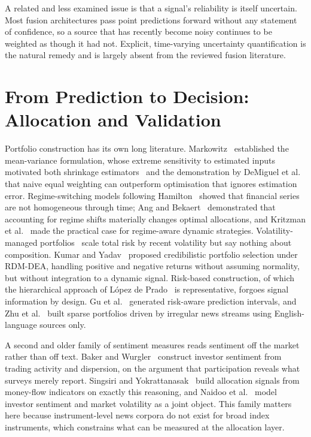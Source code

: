 A related and less examined issue is that a signal's reliability is itself uncertain.
Most fusion architectures pass point predictions forward without any statement of
confidence, so a source that has recently become noisy continues to be weighted as though
it had not. Explicit, time-varying uncertainty quantification is the natural remedy and
is largely absent from the reviewed fusion literature.

\section{From Prediction to Decision: Allocation and Validation}

Portfolio construction has its own long literature. Markowitz~\cite{markowitz1952}
established the mean-variance formulation, whose extreme sensitivity to estimated inputs
motivated both shrinkage estimators~\cite{ledoit2004} and the demonstration by DeMiguel et
al.~\cite{demiguel2009} that naive equal weighting can outperform optimisation that
ignores estimation error. Regime-switching models following Hamilton~\cite{hamilton1989}
showed that financial series are not homogeneous through time; Ang and
Bekaert~\cite{ang2002} demonstrated that accounting for regime shifts materially changes
optimal allocations, and Kritzman et al.~\cite{kritzman2012} made the practical case for
regime-aware dynamic strategies. Volatility-managed portfolios~\cite{moreira2017} scale
total risk by recent volatility but say nothing about composition. Kumar and
Yadav~\cite{kumar2024rdmdea} proposed credibilistic portfolio selection under
RDM-DEA, handling positive and negative returns without assuming normality, but without
integration to a dynamic signal. Risk-based construction, of which the hierarchical
approach of L\'opez de Prado~\cite{lopezdeprado2016} is representative, forgoes signal
information by design. Gu et al.~\cite{gu2025ragic} generated risk-aware prediction
intervals, and Zhu et al.~\cite{zhu2025spin} built sparse portfolios driven by irregular
news streams using English-language sources only.

A second and older family of sentiment measures reads sentiment off the market rather
than off text. Baker and Wurgler~\cite{bakerwurgler2007} construct investor sentiment
from trading activity and dispersion, on the argument that participation reveals what
surveys merely report. Singsiri and Yokrattanasak~\cite{singsiri2026} build allocation
signals from money-flow indicators on exactly this reasoning, and Naidoo et
al.~\cite{naidoo2025} model investor sentiment and market volatility as a joint object.
This family matters here because instrument-level news corpora do not exist for broad
index instruments, which constrains what can be measured at the allocation layer.

